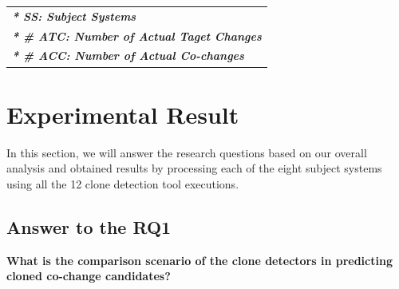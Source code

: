 \documentclass[review]{elsarticle}
\begin{document}
\begin{table}[]
\begin{tabular}{lcccc}
\multicolumn{5}{l}{\textit{\textbf{* SS: Subject Systems}}}                                                                                                                                         \\
\multicolumn{5}{l}{\textit{\textbf{* \# ATC: Number of   Actual Taget Changes}}}                                                                                                                    \\
\multicolumn{5}{l}{\textit{\textbf{* \# ACC: Number of   Actual Co-changes}}}                                                                                                                      
\end{tabular}
\end{table}

\section{Experimental Result}
\label{the-experimental-result}
In this section, we will answer the research questions based on our overall analysis and obtained results by processing each of the eight subject systems using all the 12 clone detection tool executions. 

\subsection{Answer to the \textbf{RQ1}}
\textbf{What is the comparison scenario of the clone detectors in predicting cloned co-change candidates?}\\
\end{document}

